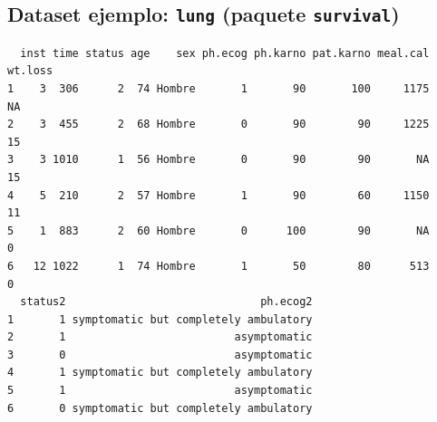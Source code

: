 \documentclass[
]{article}
\newenvironment{Shaded}{\begin{snugshade}}{\end{snugshade}}
\newcommand{\AttributeTok}[1]{\textcolor[rgb]{0.40,0.45,0.13}{#1}}
\newcommand{\DecValTok}[1]{\textcolor[rgb]{0.68,0.00,0.00}{#1}}
\newcommand{\FunctionTok}[1]{\textcolor[rgb]{0.28,0.35,0.67}{#1}}
\newcommand{\NormalTok}[1]{\textcolor[rgb]{0.00,0.23,0.31}{#1}}
\newcommand{\OtherTok}[1]{\textcolor[rgb]{0.00,0.23,0.31}{#1}}
\newcommand{\SpecialCharTok}[1]{\textcolor[rgb]{0.37,0.37,0.37}{#1}}
\newcommand{\StringTok}[1]{\textcolor[rgb]{0.13,0.47,0.30}{#1}}
\begin{document}
\subsection{\texorpdfstring{Dataset ejemplo: \texttt{lung} (paquete
\texttt{survival})}{Dataset ejemplo: lung (paquete survival)}}\label{dataset-ejemplo-lung-paquete-survival}

\begin{Shaded}
\end{Shaded}

\begin{verbatim}
  inst time status age    sex ph.ecog ph.karno pat.karno meal.cal wt.loss
1    3  306      2  74 Hombre       1       90       100     1175      NA
2    3  455      2  68 Hombre       0       90        90     1225      15
3    3 1010      1  56 Hombre       0       90        90       NA      15
4    5  210      2  57 Hombre       1       90        60     1150      11
5    1  883      2  60 Hombre       0      100        90       NA       0
6   12 1022      1  74 Hombre       1       50        80      513       0
  status2                              ph.ecog2
1       1 symptomatic but completely ambulatory
2       1                          asymptomatic
3       0                          asymptomatic
4       1 symptomatic but completely ambulatory
5       1                          asymptomatic
6       0 symptomatic but completely ambulatory
\end{verbatim}
\end{document}
